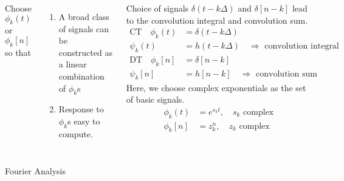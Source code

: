 \begin{frame}[plain]
\begin{columns}
                \pause
                Choose $\phi_k(t)$ or $\phi_k[n]$ so that
                \begin{enumerate}
                    \item A broad class of signals can be constructed as a linear combination of $\phi_k$s
                    \item Response to $\phi_k$s easy to compute.
                \end{enumerate}   
                \pause                               
                Choice of signals $\delta(t-k\Delta)$ and $\delta[n-k]$ lead to the convolution integral and convolution sum. 
                \begin{align*}
                    \text{CT}\quad \phi_k(t) &=  \delta(t-k\Delta)\\
                    \psi_k(t) &= h(t-k\Delta)\quad \Rightarrow \text{ convolution integral}\\
                    \text{DT}\quad \phi_k[n] &=  \delta[n-k]\\
                    \psi_k[n] &= h[n-k]\quad \Rightarrow \text{ convolution sum}                    
                \end{align*} 
                \pause                 
                Here, we  choose complex exponentials as the set of basic signals.
                \begin{align*}
                    \phi_k(t) &= e^{s_k t},\quad s_k \text{ complex}\\
                    \phi_k[n] &= z_k^n,\quad z_k \text{ complex}\\
                \end{align*}
                
    \end{columns}
\end{frame} 

\begin{frame}{Fourier Analysis}
    
\end{frame}

%
